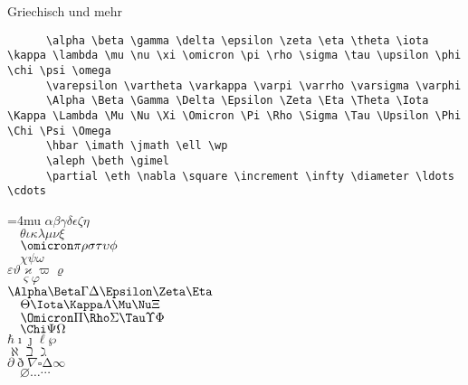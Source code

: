 \begin{frame}[fragile]{Griechisch und mehr}
  \begin{CodeExample}{0.70}
    \begin{lstlisting}
      \alpha \beta \gamma \delta \epsilon \zeta \eta \theta \iota \kappa \lambda \mu \nu \xi \omicron \pi \rho \sigma \tau \upsilon \phi \chi \psi \omega
      \varepsilon \vartheta \varkappa \varpi \varrho \varsigma \varphi
      \Alpha \Beta \Gamma \Delta \Epsilon \Zeta \Eta \Theta \Iota \Kappa \Lambda \Mu \Nu \Xi \Omicron \Pi \Rho \Sigma \Tau \Upsilon \Phi \Chi \Psi \Omega
      \hbar \imath \jmath \ell \wp
      \aleph \beth \gimel
      \partial \eth \nabla \square \increment \infty \diameter \ldots \cdots
    \end{lstlisting}
  \CodeResult
    \Umathordordspacing\textstyle=4mu
    $\alpha \beta \gamma \delta \epsilon \zeta \eta$ \\
    $\quad \theta \iota \kappa \lambda \mu \nu \xi$ \\
    $\quad \omicron \pi \rho \sigma \tau \upsilon \phi$ \\
    $\quad \chi \psi \omega$ \\
    $\varepsilon \vartheta \varkappa \varpi \varrho$ \\
    $\quad \varsigma \varphi$ \\
    $\Alpha \Beta \Gamma \Delta \Epsilon \Zeta \Eta$ \\
    $\quad \Theta \Iota \Kappa \Lambda \Mu \Nu \Xi$ \\
    $\quad \Omicron \Pi \Rho \Sigma \Tau \Upsilon \Phi$ \\
    $\quad \Chi \Psi \Omega$ \\
    $\hbar \imath \jmath \ell \wp$ \\
    $\aleph \beth \gimel$ \\
    $\partial \eth \nabla \square \increment \infty$ \\
    $\quad \diameter \ldots \cdots$
  \end{CodeExample}
\end{frame}

